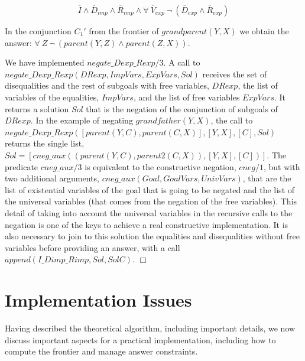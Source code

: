 \documentclass{tlp}
\newcommand{\implementation}[1]{\noindent{\sc Implementation details:}
  #1 $\Box$}
\begin{document}
\begin{itemize}
           \[\overline{I} \wedge \overline{D}_{imp}
           \wedge \overline{R}_{imp} \wedge \forall~
           \overline{V}_{exp}~ \neg~(\overline{D}_{exp} \wedge
           \overline{R}_{exp})\]

	   In the conjunction $C_1'$ from the frontier of $grandparent(Y,X)$
           we obtain the answer: $\forall~ Z ~ \neg~(parent(Y,Z) \wedge
           parent(Z,X))$.

\implementation{
We have implemented 
$negate\_Dexp\_Rexp/3$. A call to
$negate\_Dexp\_Rexp(DRexp,ImpVars,ExpVars,Sol)$ receives the set of
disequalities and the rest of subgoals with free variables, $DRexp$, the list
of variables of the equalities, $ImpVars$, and the list of free variables
$ExpVars$. It returns a solution $Sol$ that is the negation of the conjunction
of subgoals of $DRexp$.  In the example of negating $grandfather(Y,X)$, the
call to $negate\_Dexp\_Rexp([parent(Y,C),parent(C,X)],[Y,X],[C],Sol)$ returns
the single list,
$Sol=[cneg\_aux((parent(Y,C),parent2(C,X)),[Y,X],[C])]$. The predicate
$cneg\_aux/3$ is equivalent to the constructive negation, $cneg/1$, but with
two additional arguments, $cneg\_aux(Goal,GoalVars,UnivVars)$, that are the
list of existential variables of the goal that is going to be negated and the
list of the universal variables (that comes from the negation of the free
variables). This detail of taking into account the universal variables in the
recursive calls to the negation is one of the keys to achieve a real
constructive implementation. It is also necessary to join to this solution
the equalities and disequalities without free variables before providing an
answer, with a call $append(I\_Dimp\_Rimp,Sol,SolC)$.
}

         \end{itemize}


    


\section{Implementation Issues}
\label{implementation}

Having described the theoretical algorithm, including important
details, we now discuss important aspects for a practical
implementation, including how to compute the frontier and manage
answer constraints.
\end{document}
